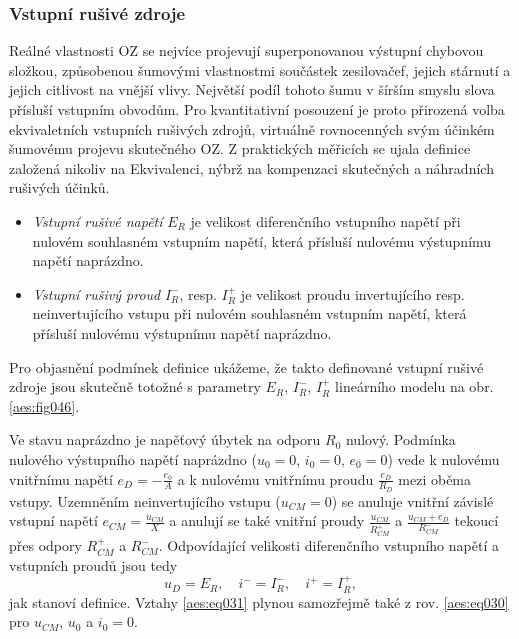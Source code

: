       \subsubsection{Vstupní rušivé zdroje}\label{aesIchIIIsecIIssecII}
        Reálné vlastnosti OZ se nejvíce projevují superponovanou výstupní chybovou složkou,
        způsobenou šumovými vlastnostmi součástek zesilovačef, jejich stárnutí a jejich citlivost na
        vnější vlivy. Největší podíl tohoto šumu v šírším smyslu slova přísluší vstupním obvodům.
        Pro kvantitativní posouzení je proto přirozená volba ekvivaletních vstupních rušivých
        zdrojů, virtuálně rovnocenných svým účinkém šumovému projevu skutečného OZ. Z praktických
        měřicích se ujala definice založená nikoliv na Ekvivalenci, nýbrž na kompenzaci skutečných a
        náhradních rušivých účinků.
        \begin{itemize}[noitemsep]
          \item \emph{Vstupní rušivé napětí} \(E_R\) je velikost diferenčního vstupního napětí při
                nulovém souhlasném vstupním napětí, která přísluší nulovému výstupnímu napětí
                naprázdno.
          \item \emph{Vstupní rušivý proud} \(I_R^-\), resp. \(I_R^+\) je velikost proudu
                invertujícího resp. neinvertujícího vstupu při nulovém souhlasném vstupním napětí,
                která přísluší nulovému výstupnímu napětí naprázdno.
        \end{itemize}

        Pro objasnění podmínek definice ukážeme, že takto definované vstupní rušivé zdroje jsou
        skutečně totožné s parametry \(E_R\), \(I_R^-\), \(I_R^+\) lineárního modelu na obr.
        \ref{aes:fig046}. 

        Ve stavu naprázdno je napěťový úbytek na odporu \(R_0\) nulový. Podmínka nulového výstupního
        napětí naprázdno (\(u_0=0\), \(i_0=0\), \(e_0=0\)) vede k nulovému vnitřnímu napětí \(e_D =
        - \frac{e_0}{A}\) a k nulovému vnitřnímu proudu \(\frac{e_D}{R_D}\) mezi oběma vstupy.
        Uzemněním neinvertujícího vstupu (\(u_{CM} = 0\)) se anuluje vnitřní závislé vstupní napětí
        \(e_{CM} = \frac{u_{CM}}{X}\) a anulují se také vnitřní proudy \(\frac{u_{CM}}{R_{CM}^+}\) a
        \(\frac{u_{CM} + e_D}{R_{CM}^-}\) tekoucí přes odpory \(R_{CM}^+\) a \(R_{CM}^-\).
        Odpovídající velikosti diferenčního vstupního napětí a vstupních proudů jsou tedy
        \begin{equation}\label{aes:eq031}
          u_D = E_R, \quad i^- = I_R^-, \quad i^+ = I_R^+,
        \end{equation}
        jak stanoví definice. Vztahy \ref{aes:eq031} plynou samozřejmě také z rov. \ref{aes:eq030}
        pro \(u_{CM}\), \(u_0\) a \(i_0 = 0\).

